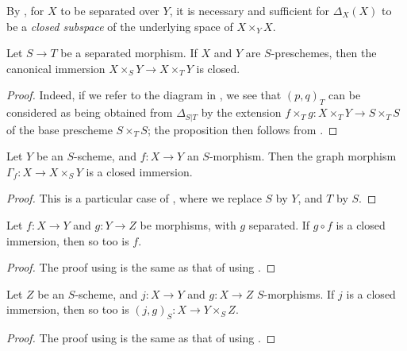 By , for $X$ to be separated over $Y$, it is necessary and sufficient for $\Delta_X(X)$ to be a \emph{closed subspace} of the underlying space of $X\times_Y X$.

\begin{prop}[5.4.2]
\label{1.5.4.2}
Let $S\to T$ be a separated morphism.
If $X$ and $Y$ are $S$-preschemes, then the canonical immersion $X\times_S Y\to X\times_T Y$  is closed.
\end{prop}

\begin{proof}
\label{proof-1.5.4.2}
Indeed, if we refer to the diagram in , we see that $(p,q)_T$ can be considered as being obtained from $\Delta_{S|T}$ by the extension $f\times_T g:X\times_T Y\to S\times_T S$ of the base prescheme $S\times_T S$;
the proposition then follows from .
\end{proof}

\begin{cor}[5.4.3]
\label{1.5.4.3}
Let $Y$ be an $S$-scheme, and $f:X\to Y$ an $S$-morphism.
Then the graph morphism $\Gamma_f:X\to X\times_S Y$  is a closed immersion.
\end{cor}

\begin{proof}
\label{proof-1.5.4.3}
This is a particular case of , where we replace $S$ by $Y$, and $T$ by $S$.
\end{proof}

\begin{cor}[5.4.4]
\label{1.5.4.4}
Let $f:X\to Y$ and $g:Y\to Z$ be morphisms, with $g$ separated.
If $g\circ f$ is a closed immersion, then so too is $f$.
\end{cor}

\begin{proof}
\label{proof-1.5.4.4}
The proof using  is the same as that of  using .
\end{proof}

\begin{cor}[5.4.5]
\label{1.5.4.5}
Let $Z$ be an $S$-scheme, and $j:X\to Y$ and $g:X\to Z$ $S$-morphisms.
If $j$ is a closed immersion, then so too is $(j,g)_S:X\to Y\times_S Z$.
\end{cor}

\begin{proof}
\label{proof-1.5.4.5}
The proof using  is the same as that of  using .
\end{proof}

